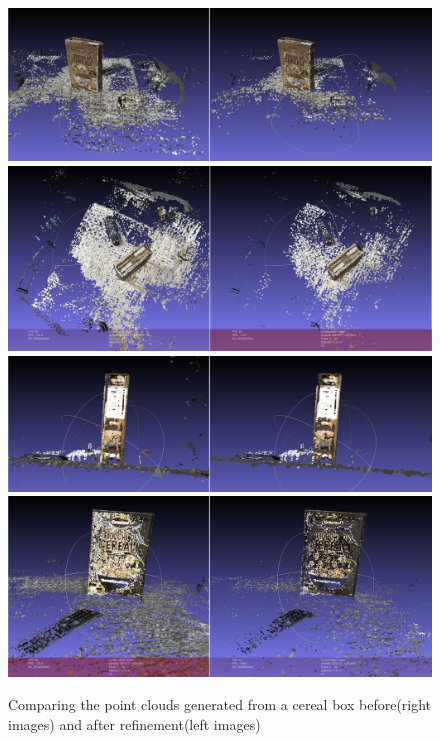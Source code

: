 \documentclass[11pt]{article}
\begin{document}
    \begin{figure}
    \centering
    \includegraphics[width=\textwidth,height=\textheight,keepaspectratio]{images/cereal.1.png}
    \includegraphics[width=\textwidth,height=\textheight,keepaspectratio]{images/cereal.2.png}
    \includegraphics[width=\textwidth,height=\textheight,keepaspectratio]{images/cereal.3.png}
    \includegraphics[width=\textwidth,height=\textheight,keepaspectratio]{images/cereal.4.png}
    \caption{Comparing the point clouds generated from a cereal box before(right images) and after refinement(left images)}
    \label{fig:cereal}
    \end{figure}
\end{document}
